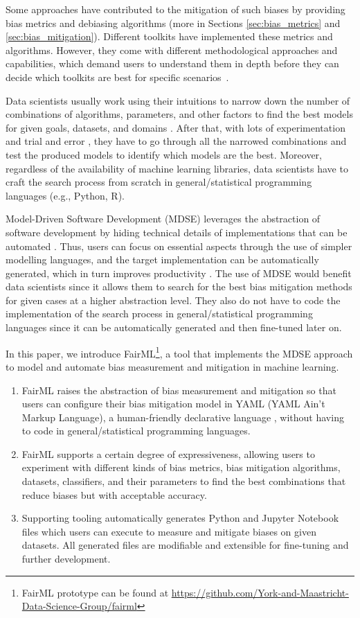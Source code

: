 \documentclass[sigconf]{acmart}
\begin{document}
	Some approaches have contributed to the mitigation of such biases by providing bias metrics and debiasing algorithms (more in Sections \ref{sec:bias_metrics} and \ref{sec:bias_mitigation}). 
	Different toolkits have implemented these metrics and algorithms.
	However, they come with different methodological approaches and capabilities, which demand users to understand them in depth before they can decide which toolkits are best for specific scenarios~\cite{lee2021landscape}.  
	
	Data scientists usually work using their intuitions to narrow down the number of combinations of algorithms, parameters, and other factors to find the best models for given goals, datasets, and domains \cite{muller2016introduction}. After that, with lots of experimentation and trial and error \cite{byrne2017development}, they have to go through all the narrowed combinations and test the produced models to identify which models are the best. Moreover, regardless of the availability of machine learning libraries, data scientists have to craft the search process from scratch in general/statistical programming languages (e.g., Python, R).
	
	Model-Driven Software Development (MDSE) leverages the abstraction of software development by hiding technical details of implementations that can be automated \cite{brambilla2017model}. Thus, users can focus on essential aspects through the use of simpler modelling languages, and the target implementation can be automatically generated, which in turn improves productivity \cite{volter2013model}. The use of MDSE would benefit data scientists since it allows them to search for the best bias mitigation methods for given cases at a higher abstraction level. They also do not have to code the implementation of the search process in general/statistical programming languages since it can be automatically generated and then fine-tuned later on. 
	
	In this paper, we introduce FairML\footnote{FairML prototype can be found at \url{https://github.com/York-and-Maastricht-Data-Science-Group/fairml}}, a tool that implements the MDSE approach to model and automate bias measurement and mitigation in machine learning. 
	\begin{enumerate}
		\item FairML raises the abstraction of bias measurement and mitigation so that users can configure their bias mitigation model in YAML (YAML Ain't Markup Language), a human-friendly declarative language \cite{evans2017yaml}, without having to code in general/statistical programming languages.
		\item FairML supports a certain degree of expressiveness, allowing users to experiment with different kinds of bias metrics, bias mitigation algorithms, datasets, classifiers, and their parameters to find the best combinations that reduce biases but with acceptable accuracy.
		\item Supporting tooling automatically generates Python and Jupyter Notebook files which users can execute to measure and mitigate biases on given datasets. All generated files are modifiable and extensible for fine-tuning and further development. 
	\end{enumerate}
	
\end{document}
